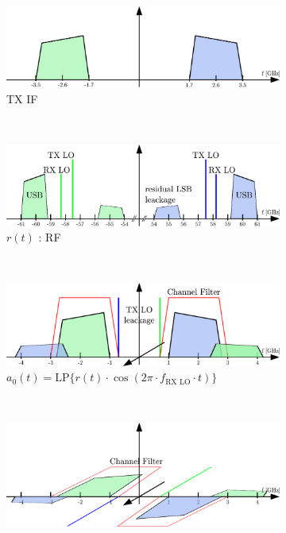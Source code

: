 \begin{figure}[h!]
  \centering
  \begin{subfigure}{0.45\textwidth}
    \centering
    \includegraphics[width=\textwidth]{figures/rx_2_freq_tx_if}
    \caption{\gls{TX} \gls{IF}}
    \label{fig:rx_2_freq_tx_if}
  \end{subfigure}
  ~
  \begin{subfigure}{0.45\textwidth}
    \centering
    \includegraphics[width=\textwidth]{figures/rx_2_freq_rf}
    \caption{$r(t)$ : \gls{RF}}
    \label{fig:rx_2_freq_rf}
  \end{subfigure}
  \vspace{4ex} \\
  \begin{subfigure}{0.45\textwidth}
    \centering
    \includegraphics[width=\textwidth]{figures/rx_2_freq_a_0}
    \caption{$a_0(t) = \text{LP}\{r(t) \cdot \cos(2\pi \cdot f_{\text{RX LO}} \cdot t)\}$}
    \label{fig:rx_2_freq_a_0}
  \end{subfigure}
  ~
  \begin{subfigure}{0.45\textwidth}
    \centering
    \includegraphics[width=\textwidth]{figures/rx_2_freq_a_1}

\end{subfigure}
\end{figure}
